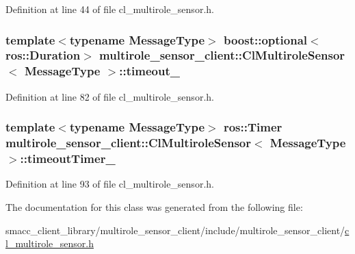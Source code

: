 Definition at line 44 of file cl\+\_\+multirole\+\_\+sensor.\+h.

\subsubsection[{\texorpdfstring{timeout\+\_\+}{timeout_}}]{\setlength{\rightskip}{0pt plus 5cm}template$<$typename Message\+Type$>$ boost\+::optional$<$ros\+::\+Duration$>$ {\bf multirole\+\_\+sensor\+\_\+client\+::\+Cl\+Multirole\+Sensor}$<$ Message\+Type $>$\+::timeout\+\_\+}\hypertarget{classmultirole__sensor__client_1_1ClMultiroleSensor_ad3f88235bff8714c6abe97dec3c276ea}{}\label{classmultirole__sensor__client_1_1ClMultiroleSensor_ad3f88235bff8714c6abe97dec3c276ea}


Definition at line 82 of file cl\+\_\+multirole\+\_\+sensor.\+h.

\subsubsection[{\texorpdfstring{timeout\+Timer\+\_\+}{timeoutTimer_}}]{\setlength{\rightskip}{0pt plus 5cm}template$<$typename Message\+Type$>$ ros\+::\+Timer {\bf multirole\+\_\+sensor\+\_\+client\+::\+Cl\+Multirole\+Sensor}$<$ Message\+Type $>$\+::timeout\+Timer\+\_\+\hspace{0.3cm}{\ttfamily [private]}}\hypertarget{classmultirole__sensor__client_1_1ClMultiroleSensor_a1ac5801d1a126ebc3bd774bb001524fa}{}\label{classmultirole__sensor__client_1_1ClMultiroleSensor_a1ac5801d1a126ebc3bd774bb001524fa}


Definition at line 93 of file cl\+\_\+multirole\+\_\+sensor.\+h.



The documentation for this class was generated from the following file\+:\begin{DoxyCompactItemize}
\item 
smacc\+\_\+client\+\_\+library/multirole\+\_\+sensor\+\_\+client/include/multirole\+\_\+sensor\+\_\+client/\hyperlink{cl__multirole__sensor_8h}{cl\+\_\+multirole\+\_\+sensor.\+h}\end{DoxyCompactItemize}
